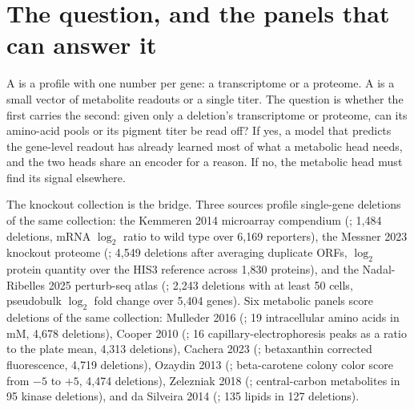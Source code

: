 
\section{The question, and the panels that can answer it}
\label{sec:question}

A  is a profile with one number per gene: a transcriptome or a
proteome. A  is a small vector of metabolite readouts or a
single titer. The question is whether the first carries the second: given only a
deletion's transcriptome or proteome, can its amino-acid pools or its pigment titer be
read off? If yes, a model that predicts the gene-level readout has already learned most
of what a metabolic head needs, and the two heads share an encoder for a reason. If no,
the metabolic head must find its signal elsewhere.

The knockout collection is the bridge. Three sources profile single-gene deletions of the
same collection: the Kemmeren 2014 microarray compendium
(; 1{,}484 deletions, mRNA $\log_2$ ratio to wild
type over 6{,}169 reporters), the Messner 2023 knockout proteome
(; 4{,}549 deletions after averaging duplicate
ORFs, $\log_2$ protein quantity over the HIS3 reference across 1{,}830 proteins), and the
Nadal-Ribelles 2025 perturb-seq atlas (; 2{,}243
deletions with at least 50 cells, pseudobulk $\log_2$ fold change over 5{,}404 genes).
Six metabolic panels score deletions of the same collection: Mulleder 2016
(; 19 intracellular amino acids in mM, 4{,}678
deletions), Cooper 2010 (; 16 capillary-electrophoresis
peaks as a ratio to the plate mean, 4{,}313 deletions), Cachera 2023
(; betaxanthin corrected fluorescence, 4{,}719
deletions), Ozaydin 2013 (; beta-carotene colony
color score from $-5$ to $+5$, 4{,}474 deletions), Zelezniak 2018
(; central-carbon metabolites in 95 kinase
deletions), and da Silveira 2014 (; 135 lipids in
127 deletions).

